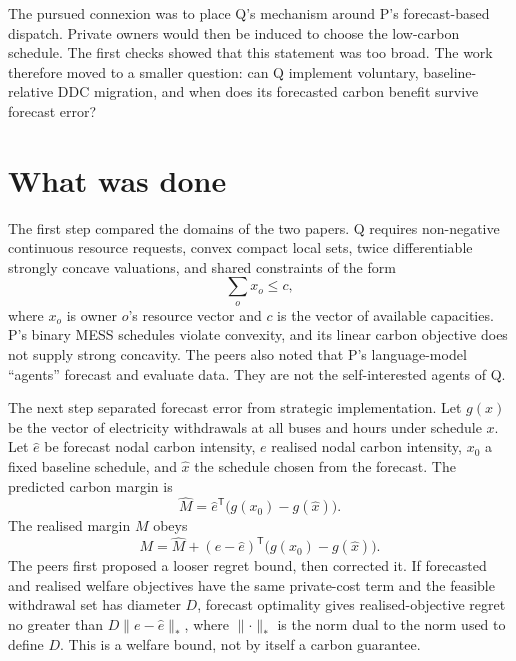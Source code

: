 \documentclass{article}
\begin{document}
The pursued connexion was to place Q's mechanism around P's forecast-based dispatch.  Private owners would then be induced to choose the low-carbon schedule.  The first checks showed that this statement was too broad.  The work therefore moved to a smaller question: can Q implement voluntary, baseline-relative DDC migration, and when does its forecasted carbon benefit survive forecast error?

\section{What was done}

The first step compared the domains of the two papers.  Q requires non-negative continuous resource requests, convex compact local sets, twice differentiable strongly concave valuations, and shared constraints of the form
\begin{equation}
  \sum_o x_o \leq c,
\end{equation}
where $x_o$ is owner $o$'s resource vector and $c$ is the vector of available capacities.  P's binary MESS schedules violate convexity, and its linear carbon objective does not supply strong concavity.  The peers also noted that P's language-model ``agents'' forecast and evaluate data.  They are not the self-interested agents of Q.

The next step separated forecast error from strategic implementation.  Let $g(x)$ be the vector of electricity withdrawals at all buses and hours under schedule $x$.  Let $\widehat e$ be forecast nodal carbon intensity, $e$ realised nodal carbon intensity, $x_0$ a fixed baseline schedule, and $\widehat x$ the schedule chosen from the forecast.  The predicted carbon margin is
\begin{equation}
  \widehat M=\widehat e^{\mathsf T}\bigl(g(x_0)-g(\widehat x)\bigr).
\end{equation}
The realised margin $M$ obeys
\begin{equation}
  M=\widehat M+(e-\widehat e)^{\mathsf T}
       \bigl(g(x_0)-g(\widehat x)\bigr).
  \label{eq:identity}
\end{equation}
The peers first proposed a looser regret bound, then corrected it.  If forecasted and realised welfare objectives have the same private-cost term and the feasible withdrawal set has diameter $D$, forecast optimality gives realised-objective regret no greater than $D\lVert e-\widehat e\rVert_*$, where $\lVert\cdot\rVert_*$ is the norm dual to the norm used to define $D$.  This is a welfare bound, not by itself a carbon guarantee.
\end{document}
